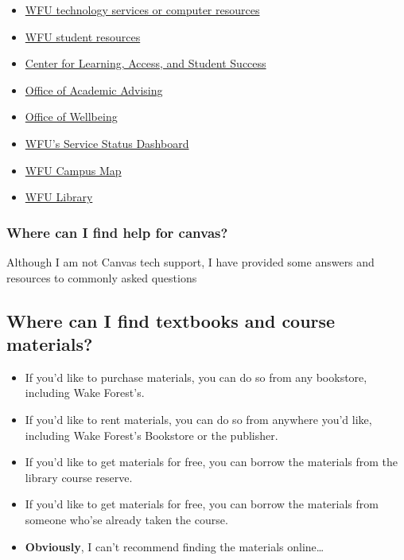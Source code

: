 \begin{itemize}
\tightlist
\item
  \href{https://is.wfu.edu/student/}{WFU technology services or computer resources}
\item
  \href{https://college.wfu.edu/student-resources/}{WFU student resources}
\item
  \href{https://class.wfu.edu/}{Center for Learning, Access, and Student Success}
\item
  \href{https://advising.wfu.edu/}{Office of Academic Advising}
\item
  \href{https://thrive.wfu.edu/}{Office of Wellbeing}
\item
  \href{https://status.is.wfu.edu/}{WFU's Service Status Dashboard}
\item
  \href{https://map.wfu.edu/}{WFU Campus Map}
\item
  \href{https://zsr.wfu.edu/}{WFU Library}
\end{itemize}

\hypertarget{where-can-i-find-help-for-canvas}{%
\subsubsection{Where can I find help for canvas?}\label{where-can-i-find-help-for-canvas}}

Although I am not Canvas tech support, I have provided some answers and resources to commonly asked questions

\hypertarget{where-can-i-find-textbooks-and-course-materials}{%
\subsection{Where can I find textbooks and course materials?}\label{where-can-i-find-textbooks-and-course-materials}}

\begin{itemize}
\tightlist
\item
  If you'd like to purchase materials, you can do so from any bookstore, including Wake Forest's.
\item
  If you'd like to rent materials, you can do so from anywhere you'd like, including Wake Forest's Bookstore or the publisher.
\item
  If you'd like to get materials for free, you can borrow the materials from the library course reserve.
\item
  If you'd like to get materials for free, you can borrow the materials from someone who'se already taken the course.
\item
  \textbf{Obviously}, I can't recommend finding the materials online\ldots{}
\end{itemize}

